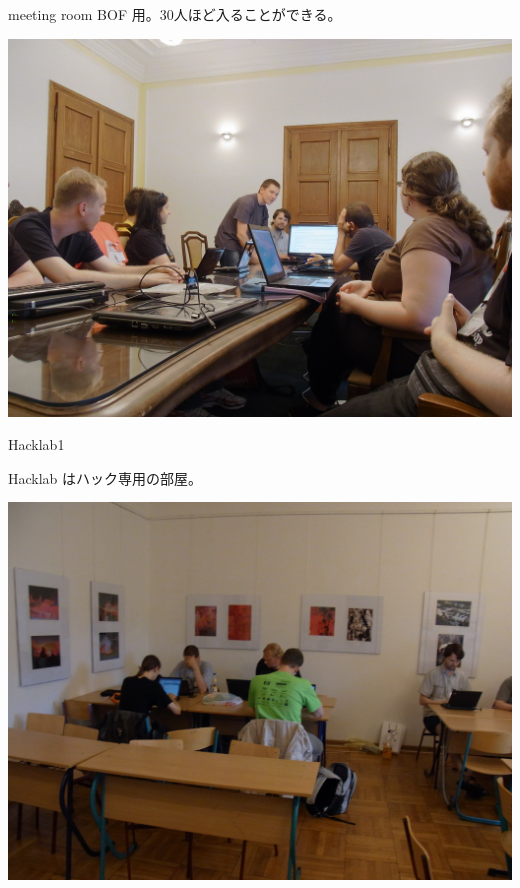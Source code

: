 \begin{frame}{meeting room}
BOF 用。30人ほど入ることができる。
\begin{center}
\includegraphics[width=0.9\hsize]{image201108/debconf11_meetingroom.jpg}
\end{center}
\end{frame}

\begin{frame}{Hacklab1}

Hacklab はハック専用の部屋。\\
\begin{center}
\includegraphics[width=0.8\hsize]{image201108/debconf11_hacklab1.jpg}
\end{center}
\end{frame}

